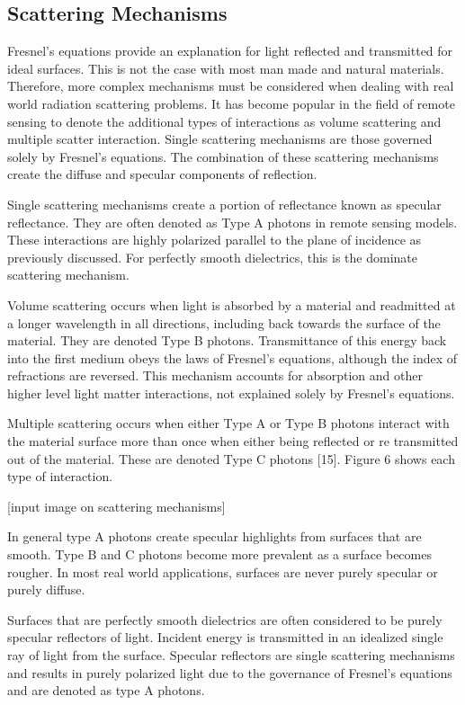 \subsection{Scattering Mechanisms}

Fresnel’s equations provide an explanation for light reflected and transmitted for ideal surfaces.  This is not the case with most man made and natural materials.  Therefore, more complex mechanisms must be considered when dealing with real world radiation scattering problems.  It has become popular in the field of remote sensing to denote the additional types of interactions as volume scattering and multiple scatter interaction.  Single scattering mechanisms are those governed solely by Fresnel’s equations.  The combination of these scattering mechanisms create the diffuse and specular components of reflection.

Single scattering mechanisms create a portion of reflectance known as specular reflectance.  They are often denoted as Type A photons in remote sensing models.  These interactions are highly polarized parallel to the plane of incidence as previously discussed. For perfectly smooth dielectrics, this is the dominate scattering mechanism.

Volume scattering occurs when light is absorbed by a material and readmitted at a longer wavelength in all directions, including back towards the surface of the material.  They are denoted Type B photons.  Transmittance of this energy back into the first medium obeys the laws of Fresnel’s equations, although the index of refractions are reversed.  This mechanism accounts for absorption and other higher level light matter interactions, not explained solely by Fresnel’s equations.

Multiple scattering occurs when either Type A or Type B photons interact with the material surface more than once when either being reflected or re transmitted out of the material.  These are denoted Type C photons [15].  Figure 6 shows each type of interaction.

[input image on scattering mechanisms]

In general type A photons create specular highlights from surfaces that are smooth.  Type B and C photons become more prevalent as a surface becomes rougher.  In most real world applications, surfaces are never purely specular or purely diffuse.

Surfaces that are perfectly smooth dielectrics are often considered to be purely specular reflectors of light.  Incident energy is transmitted in an idealized single ray of light from the surface.  Specular reflectors are single scattering mechanisms and results in purely polarized light due to the governance of Fresnel’s equations and are denoted as type A photons.

